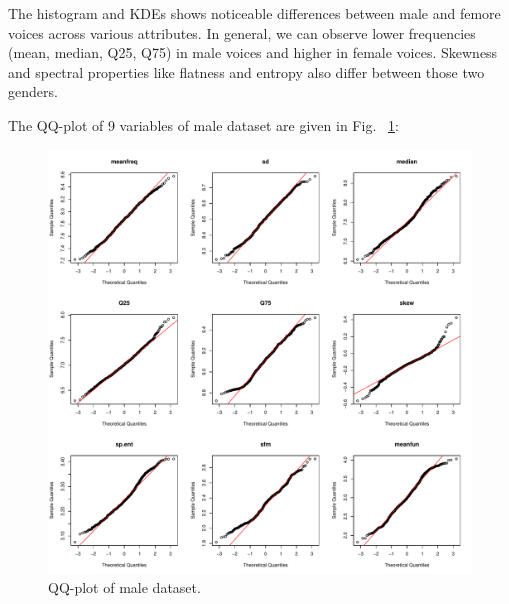 \documentclass{article}
\begin{document}
	The histogram and KDEs shows noticeable differences between male and femore voices across various attributes. In general, we can observe lower frequencies (mean, median, Q25, Q75) in male voices and higher in female voices. Skewness and spectral properties like flatness and entropy also differ between those two genders. 
	
	The QQ-plot of 9 variables of male dataset are given in Fig. ~\ref{qq_male}:
	\begin{figure}
		\centering
		\includegraphics[width=\textwidth]{graphs/gender/qq_plot_male.pdf}
		\caption{QQ-plot of male dataset.}
		\label{qq_male}
	\end{figure}
	
\end{document}
